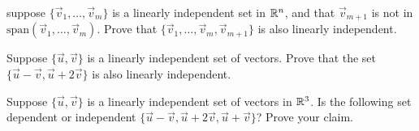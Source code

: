 \documentclass{ximera}
\begin{document}
\begin{problem}
\begin{problem}
\begin{center}
\end{center}
\end{problem}


\begin{problem}\label{prob:linindmultchoice11}
\begin{multipleChoice}
 \end{multipleChoice}
\begin{center}
\end{center}
\end{problem}

\end{problem}

\begin{problem}\label{prob:Adding1OK}
suppose $\{\vec{v}_{1}, \dots , \vec{v}_{m}\}$ is a linearly independent set in $\mathbb{R}^n$, and that $\vec{v}_{m+1}$ is not in $\mbox{span}\left(\vec{v}_{1}, \dots , \vec{v}_{m}\right)$.  Prove that $\{\vec{v}_{1}, \dots , \vec{v}_{m}, \vec{v}_{m+1}\}$ is also linearly independent.
\end{problem}

\begin{problem}\label{prob:OtherLinearComb}
Suppose $\{{\vec{u}},{\vec{v}}\}$ is a linearly independent set of vectors.  Prove that the set $\{\vec{u} -\vec{v}, \vec{u}+2\vec{v}\}$ is also linearly independent.
\end{problem}

\begin{problem}\label{prob:OtherLinearComb2}
Suppose $\{{\vec{u}},{\vec{v}}\}$ is a linearly independent set of vectors in $\mathbb{R}^3$.  Is the following set dependent or independent $\{\vec{u} -\vec{v}, \vec{u}+2\vec{v}, \vec{u}+\vec{v}\}$? Prove your claim.
\end{problem}
\end{document}
